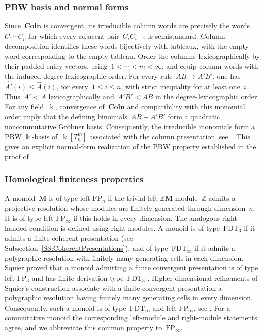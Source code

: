 \documentclass[a4paper, twoside, 11pt, english]{article}
\theoremstyle{plain}
\theoremstyle{definition}
\newcommand{\fl}{\rightarrow}
\newcommand{\M}{\mathbf{M}}
\newcommand{\Colo}{\mathbf{Coln}}
\begin{document}
\subsubsection{PBW basis and normal forms}

Since~$\Colo$ is convergent, its irreducible column words are
precisely the words~$C_1\cdots C_p$ for which every adjacent
pair~$C_iC_{i+1}$ is semistandard.
Column decomposition identifies these words bijectively with  tableaux, with the empty word corresponding
to the empty tableau.
Order the columns lexicographically by their padded entry vectors,
using~$1<\cdots<m<\infty$, and equip column words with the induced
degree-lexicographic order.
For every rule~$AB\fl A'B'$, one has~$\widehat{A'}(i)\le\widehat A(i)$, for every~$1\le i\le n$, with strict inequality for at least one~$i$.
Thus~$A'<A$ lexicographically and~$A'B'<AB$ in the
degree-lexicographic order.
For any field~$\Bbbk$, convergence of~$\Colo$ and compatibility
with this monomial order imply that the defining
binomials~$AB-A'B'$ form a quadratic noncommutative
Gr\"obner basis.
Consequently, the irreducible monomials form a PBW
$\Bbbk$-basis of~$\Bbbk[T_n^m]$ associated with the column
presentation, see~\cite[Proposition~3.5.4]{GuiraudHoffbeckMalbos19}.
This gives an explicit normal-form realization of the PBW
property established in the proof of
\cite[Corollary~2.14]{DaughertyGonzalezMunizOcalPanTorres25}.



\subsubsection{Homological finiteness properties}

A monoid~$\M$ is of type left-$\mathrm{FP}_n$ if the trivial left
$\mathbb Z\M$-module~$\mathbb Z$ admits a projective resolution whose
modules are finitely generated through dimension~$n$. It is of type
left-$\mathrm{FP}_\infty$ if this holds in every dimension. The analogous
right-handed condition is defined using right modules.
A monoid is of type~$\mathrm{FDT}_3$ if it admits a finite
coherent presentation (see Subsection~\ref{SS:CoherentPresentations}), and of type~$\mathrm{FDT}_\infty$
if it admits a polygraphic resolution with finitely many
generating cells in each dimension.
Squier proved that a monoid admitting a finite convergent presentation is
of type left-$\mathrm{FP}_3$ and has finite derivation type~$\mathrm{FDT}_3$
\cite{Squier87,Squier94}. Higher-dimensional refinements of Squier's
construction associate with a finite convergent presentation a polygraphic
resolution having finitely many generating cells in every dimension.
Consequently, such a monoid is of type~$\mathrm{FDT}_\infty$ and
left-$\mathrm{FP}_\infty$,  see
\cite{GuiraudMalbos09, GuiraudMalbos12advances}.
For a commutative monoid the corresponding left-module and right-module
statements agree, and we abbreviate this common property to~$\mathrm{FP}_\infty$.
\end{document}

